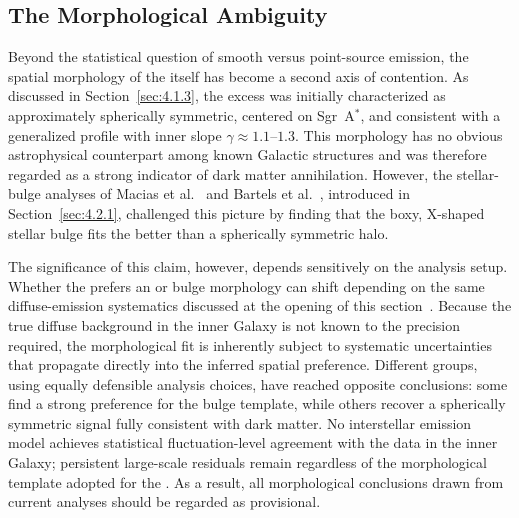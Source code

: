\subsection{The Morphological Ambiguity}
\label{sec:4.3.2}

Beyond the statistical question of smooth versus point-source emission, the spatial morphology of the \GCE itself has become a second axis of contention.
As discussed in Section~\ref{sec:4.1.3}, the excess was initially characterized as approximately spherically symmetric, centered on Sgr~A$^*$, and consistent with a generalized \NFW profile with inner slope $\gamma \approx 1.1$--$1.3$.
This morphology has no obvious astrophysical counterpart among known Galactic structures and was therefore regarded as a strong indicator of dark matter annihilation.
However, the stellar-bulge analyses of Macias et al.~\cite{Macias:2016nev,Macias:2019omb} and Bartels et al.~\cite{Bartels:2017vsx}, introduced in Section~\ref{sec:4.2.1}, challenged this picture by finding that the boxy, X-shaped stellar bulge fits the \GCE better than a spherically symmetric \NFW halo.

The significance of this claim, however, depends sensitively on the analysis setup.
Whether the \GCE prefers an \NFW or bulge morphology can shift depending on the same diffuse-emission systematics discussed at the opening of this section~\cite{Macias:2019omb}.
Because the true diffuse background in the inner Galaxy is not known to the precision required, the morphological fit is inherently subject to systematic uncertainties that propagate directly into the inferred spatial preference.
Different groups, using equally defensible analysis choices, have reached opposite conclusions: some find a strong preference for the bulge template, while others recover a spherically symmetric signal fully consistent with dark matter.
No interstellar emission model achieves statistical fluctuation-level agreement with the data in the inner Galaxy; persistent large-scale residuals remain regardless of the morphological template adopted for the \GCE.
As a result, all morphological conclusions drawn from current analyses should be regarded as provisional.

